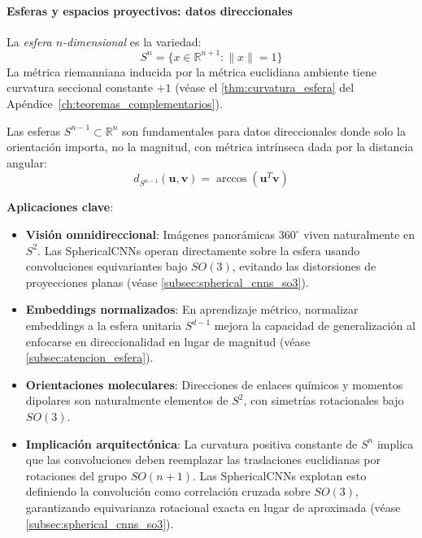 \paragraph{Esferas y espacios proyectivos: datos direccionales}

\begin{definition}\label{def:esfera_n}
La \textit{esfera $n$-dimensional} es la variedad:
\[
S^n = \{x \in \mathbb{R}^{n+1} : \|x\| = 1\}
\]
La métrica riemanniana inducida por la métrica euclidiana ambiente tiene curvatura seccional constante $+1$ (véase el \autoref{thm:curvatura_esfera} del Apéndice~\ref{ch:teoremas_complementarios}).
\end{definition}

Las esferas $S^{n-1} \subset \mathbb{R}^n$ son fundamentales para datos direccionales donde solo la orientación importa, no la magnitud, con métrica intrínseca dada por la distancia angular:
\[
d_{S^{n-1}}(\mathbf{u}, \mathbf{v}) = \arccos(\mathbf{u}^T \mathbf{v})
\]

\textbf{Aplicaciones clave}:
\begin{itemize}
    \item \textbf{Visión omnidireccional}: Imágenes panorámicas $360^\circ$ viven naturalmente en $S^2$. Las \glspl{SphericalCNN} \citep{cohen2018sphericalcnns} operan directamente sobre la esfera usando convoluciones equivariantes bajo $SO(3)$, evitando las distorsiones de proyecciones planas (véase \autoref{subsec:spherical_cnns_so3}).

    \item \textbf{Embeddings normalizados}: En aprendizaje métrico, normalizar embeddings a la esfera unitaria $S^{d-1}$ mejora la capacidad de generalización al enfocarse en direccionalidad en lugar de magnitud \citep{wang2017normface} (véase \autoref{subsec:atencion_esfera}).

    \item \textbf{Orientaciones moleculares}: Direcciones de enlaces químicos y momentos dipolares son naturalmente elementos de $S^2$, con simetrías rotacionales bajo $SO(3)$.

    \item \textbf{Implicación arquitectónica}: La curvatura positiva constante de $S^n$ implica que las convoluciones deben reemplazar las traslaciones euclidianas por rotaciones del grupo $SO(n+1)$. Las \glspl{SphericalCNN} explotan esto definiendo la convolución como correlación cruzada sobre $SO(3)$, garantizando equivarianza rotacional exacta en lugar de aproximada (véase \autoref{subsec:spherical_cnns_so3}).
\end{itemize}

